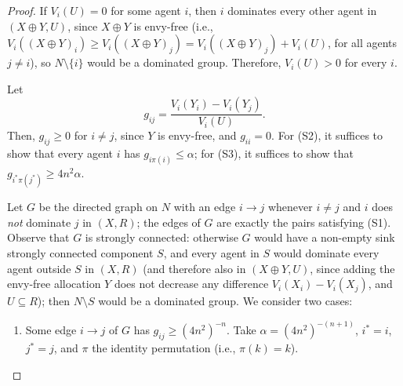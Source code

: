 \documentclass[11pt]{article}
\theoremstyle{plain}
\theoremstyle{definition}
\theoremstyle{plain}
\begin{document}
\begin{proof}
If $V_i(U)=0$ for some agent $i$, then $i$ dominates every other agent in $(X\oplus Y,U)$, since $X\oplus Y$ is envy-free (i.e., $V_i( (X\oplus Y)_i ) \geq V_i( (X\oplus Y)_j ) = V_i( (X\oplus Y)_j ) + V_i(U)$, for all agents $j \neq i$), so $N\setminus\{i\}$ would be a dominated group. Therefore, $V_i(U)>0$ for every $i$. 

Let
\[
g_{ij}=\frac{V_i(Y_i)-V_i(Y_j)}{V_i(U)}.
\]
Then, $g_{ij} \geq 0$ for $i \neq j$, since $Y$ is envy-free, and $g_{ii}=0$. For (S2), it suffices to show that every agent $i$ has $g_{i\pi(i)}\le\alpha$; for (S3), it suffices to show that $g_{i^*\pi(j^*)}\ge 4n^2\alpha$. 

Let $G$ be the directed graph on $N$ with an edge $i\to j$ whenever $i\ne j$ and $i$ does \emph{not} dominate $j$ in $(X,R)$; the edges of $G$ are exactly the pairs satisfying (S1). Observe that $G$ is strongly connected: otherwise $G$ would have a non-empty sink strongly connected component $S$, and every agent in $S$ would dominate every agent outside $S$ in $(X,R)$ (and therefore also in $(X\oplus Y,U)$, since adding the envy-free allocation $Y$ does not decrease any difference $V_i(X_i)-V_i(X_j)$, and $U\subseteq R$); then $N\setminus S$ would be a dominated group. We consider two cases:
\begin{enumerate}[leftmargin=*]
    \item Some edge $i \to j$ of $G$ has $g_{ij}\ge (4n^2)^{-n}$. Take $\alpha=(4n^2)^{-(n+1)}$, $i^* = i$, $j^* = j$, and $\pi$ the identity permutation (i.e., $\pi(k) = k $). 
    

\end{enumerate}
\end{proof}
\end{document}

